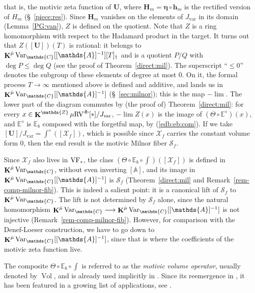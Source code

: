 \documentclass[12pt]{amsart}
\newcommand{\memph}[1]{{\color{magenta}\emph{#1}}}
\theoremstyle{plain}
\theoremstyle{definition}
\theoremstyle{remark}
\numberwithin{equation}{section}
\theoremstyle{plain}
\newcommand{\VF}{\textup{VF}}
\newcommand{\RV}{\textup{RV}}
\newcommand{\Z}{\mathds{Z}}
\newcommand{\A}{\mathds{A}}
\newcommand{\C}{\mathds{C}}
\newcommand{\0}{\emptyset}
\newcommand{\mdl}[1]{\mathcal{#1}}  %
\newcommand{\bb}[1]{\mathbb{#1}}
\newcommand{\limplies}{\rightarrow}
\newcommand{\fun}{\longrightarrow}
\newcommand{\mgRV}{{\mu}{\RV}}
\DeclareMathOperator{\ggk}{\mathbf{K}}
\DeclareMathOperator{\db}{d \! b}
\newcommand{\var}{\textup{Var}}
\DeclareMathOperator{\Vol}{Vol}
\newcommand{\gmv}{\ggk^{\hat \mu}\var_{\C}}
\begin{document}
that is, the motivic zeta function of $\bm U$, where $\bm H_m = \bm \eta \circ \bm h_m$ is the rectified version of $H_m$ (\S~\ref{piece:res}). Since $\bm H_m$ vanishes on the elements of $J_{\mathrm{var}}$ in its domain (Lemma~\ref{PG:van}), $Z$ is defined on the quotient. Note that $Z$ is a ring homomorphism with respect to the Hadamard product in the target. It turns out that $Z([\bm U])(T)$ is rational: it belongs to $\gmv[[\A]^{-1}][T]_{\dag}$ and is a quotient $P/Q$ with $\deg P \leq \deg Q$ (see the proof of Theorem~\ref{direct:mil}). The superscript ``$\leq 0$'' denotes the subgroup of these elements of degree at most $0$. On it, the formal process $T \limplies \infty$ mentioned above is defined and additive, and lands us in $\gmv[[\A]^{-1}]$ (\S~\ref{sec:milnor}); this is the map $-\lim$. The lower part of the diagram commutes by (the proof of) Theorem~\ref{direct:mil}: for every $x \in \ggk^{\Z} \mgRV^{\db}[*]/J_{\mathrm{var}}$, $-\lim Z(x)$ is the image of $(\Theta \circ \bb E^\diamond)(x)$, and $\bb E^{\diamond}$ is $\bb E_b$ composed with the forgetful map, by (\ref{edb:eb:com}). If we take $[\bm U] / J_{\mathrm{var}} = \int^{\diamond}([\mdl X_f])$, which is possible since $\mdl X_f$ carries the constant volume form $0$, then the end result is the motivic Milnor fiber $\mathscr S_{f}$.


Since $\mdl X_f$ also lives in $\VF_*$, the class $(\Theta \circ \bb E_b \circ \int)([\mdl X_f])$ is defined in $\gmv$, without even inverting $[\A]$, and its image in $\gmv[[\A]^{-1}]$ is $\mathscr S_{f}$ (Theorem~\ref{direct:mil} and Remark~\ref{rem-comp-milnor-fib}). This is indeed a salient point: it is a canonical lift of $\mathscr S_{f}$ to $\gmv$. The lift is not determined by $\mathscr S_f$ alone, since the natural homomorphism $\gmv \fun \gmv[[\A]^{-1}]$ is not injective (Remark~\ref{rem-comp-milnor-fib}). However, for comparison with the Denef-Loeser construction, we have to go down to  $\gmv[[\A]^{-1}]$, since that is where the coefficients of the motivic zeta function live.


The composite  $\Theta \circ \bb E_b \circ \int$ is referred to as the \memph{motivic volume operator}, usually denoted by $\Vol$, and is already used implicitly in \cite{hrushovski:kazhdan:integration:vf}. Since its reemergence in \cite{hru:loe:lef}, it has been featured in a growing list of applications, see \cite{thuong-int-conj, nicaise_ps_tropical, Nic:Pay:trop:fub, forey_virtual_2017, NS-deg-stab-rat}.
\end{document}
